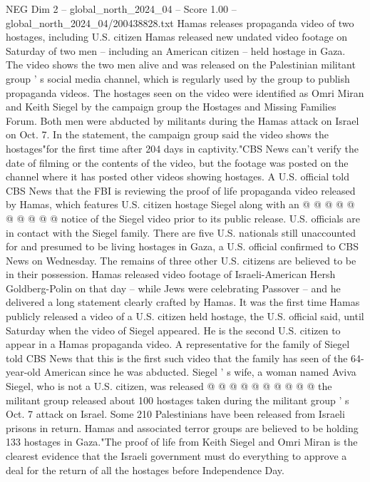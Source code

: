 \begin{textsample}{NEG Dim 2 – global\_north\_2024\_04 – Score 1.00 – global\_north\_2024\_04/200438828.txt}  \label{ex:f2_neg_179}
Hamas releases propaganda video of two hostages, including U.S. citizen Hamas released new undated video footage on Saturday of two men -- including an American citizen -- held hostage in Gaza.
The video shows the two men alive and was released on the Palestinian militant group ' s social media channel, which is regularly used by the group to publish propaganda videos.
The hostages seen on the video were identified as Omri Miran and Keith Siegel by the campaign group the Hostages and Missing Families Forum.
Both men were abducted by militants during the Hamas attack on Israel on Oct. 7.
In the statement, the campaign group said the video shows the hostages"for the first time after 204 days in captivity."CBS News can't verify the date of filming or the contents of the video, but the footage was posted on the channel where it has posted other videos showing hostages.
A U.S. official told CBS News that the FBI is reviewing the proof of life propaganda video released by Hamas, which features U.S. citizen hostage Siegel along with an @ @ @ @ @ @ @ @ @ @ notice of the Siegel video prior to its public release.
U.S. officials are in contact with the Siegel family.
There are five U.S. nationals still unaccounted for and presumed to be living hostages in Gaza, a U.S. official confirmed to CBS News on Wednesday.
The remains of three other U.S. citizens are believed to be in their possession.
Hamas released video footage of Israeli-American Hersh Goldberg-Polin on that day -- while Jews were celebrating Passover -- and he delivered a long statement clearly crafted by Hamas.
It was the first time Hamas publicly released a video of a U.S. citizen held hostage, the U.S. official said, until Saturday when the video of Siegel appeared.
He is the second U.S. citizen to appear in a Hamas propaganda video.
A representative for the family of Siegel told CBS News that this is the first such video that the family has seen of the 64-year-old American since he was abducted.
Siegel ' s wife, a woman named Aviva Siegel, who is not a U.S. citizen, was released @ @ @ @ @ @ @ @ @ @ the militant group released about 100 hostages taken during the militant group ' s Oct. 7 attack on Israel.
Some 210 Palestinians have been released from Israeli prisons in return.
Hamas and associated terror groups are believed to be holding 133 hostages in Gaza."The proof of life from Keith Siegel and Omri Miran is the clearest evidence that the Israeli government must do everything to approve a deal for the return of all the hostages before Independence Day.

\end{textsample}
